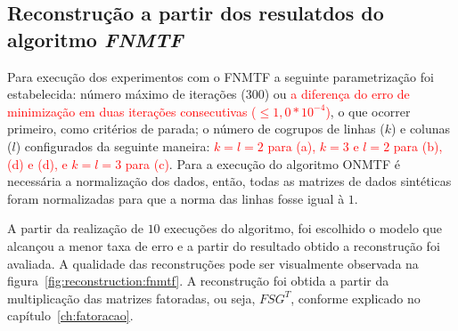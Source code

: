 \documentclass[
    12pt,                %
    oneside,            %
    a4paper,            %
    english,            %
    brazil                %
    ]{abntex2ppgsi}
\begin{document}

\subsection{Reconstrução a partir dos resulatdos do algoritmo \textit{FNMTF}}
\label{subsec:results-reconstruction-fnmtf}


Para execução dos experimentos com o FNMTF a seguinte parametrização foi estabelecida: número máximo de iterações ($300$) ou \textcolor{red}{a diferença do erro de minimização em duas iterações consecutivas ($\leq 1,0 * 10^{-4}$)}, o que ocorrer primeiro, como critérios de parada; o número de cogrupos de linhas ($k$) e colunas ($l$) configurados da seguinte maneira: \textcolor{red}{$k = l = 2$ para (a), $k = 3$ e $l = 2 $ para (b), (d) e (d), e $k = l = 3$ para (c)}. Para a execução do algoritmo ONMTF é necessária a normalização dos dados, então, todas as matrizes de dados sintéticas foram normalizadas para que a norma das linhas fosse igual à $1$.

A partir da realização de $10$ execuções do algoritmo, foi escolhido o modelo que alcançou a menor taxa de erro e a partir do resultado obtido a reconstrução foi avaliada. A qualidade das reconstruções pode ser visualmente observada na figura~\ref{fig:reconstruction:fnmtf}. A reconstrução foi obtida a partir da multiplicação das matrizes fatoradas, ou seja, $FSG^T$, conforme explicado no capítulo~\ref{ch:fatoracao}.  
\end{document}
